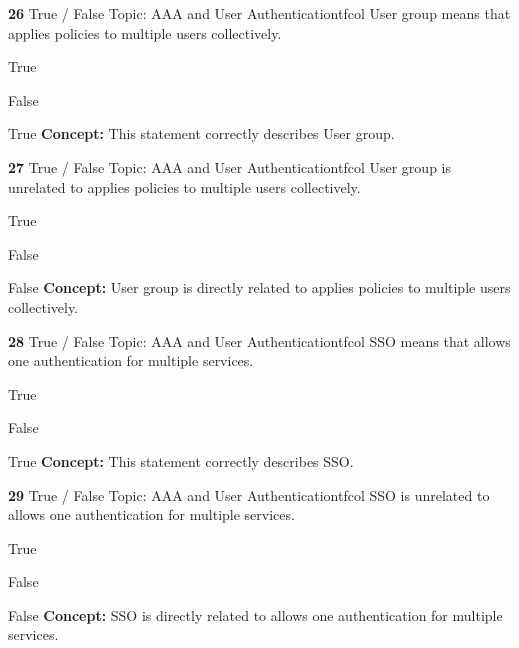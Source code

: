 \documentclass[10pt,a4paper]{article}
\begin{document}
\begin{qcard}{\color{white}\textbf{26} \hfill \small True / False \textbar{} Topic: AAA and User Authentication}{tfcol}
User group means that applies policies to multiple users collectively.

\begin{qoptions}
\item True
\item False
\end{qoptions}
\begin{explainbox}{True}
\textbf{Concept:} This statement correctly describes User group.
\end{explainbox}
\end{qcard}

\begin{qcard}{\color{white}\textbf{27} \hfill \small True / False \textbar{} Topic: AAA and User Authentication}{tfcol}
User group is unrelated to applies policies to multiple users collectively.

\begin{qoptions}
\item True
\item False
\end{qoptions}
\begin{explainbox}{False}
\textbf{Concept:} User group is directly related to applies policies to multiple users collectively.
\end{explainbox}
\end{qcard}

\begin{qcard}{\color{white}\textbf{28} \hfill \small True / False \textbar{} Topic: AAA and User Authentication}{tfcol}
SSO means that allows one authentication for multiple services.

\begin{qoptions}
\item True
\item False
\end{qoptions}
\begin{explainbox}{True}
\textbf{Concept:} This statement correctly describes SSO.
\end{explainbox}
\end{qcard}

\begin{qcard}{\color{white}\textbf{29} \hfill \small True / False \textbar{} Topic: AAA and User Authentication}{tfcol}
SSO is unrelated to allows one authentication for multiple services.

\begin{qoptions}
\item True
\item False
\end{qoptions}
\begin{explainbox}{False}
\textbf{Concept:} SSO is directly related to allows one authentication for multiple services.
\end{explainbox}
\end{qcard}
\end{document}
